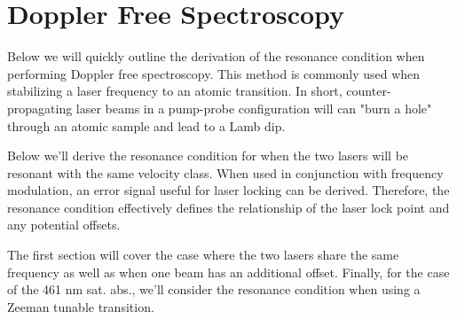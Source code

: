 \chapter{Doppler Free Spectroscopy} \label{app:dopSpec}
Below we will quickly outline the derivation of the resonance condition when performing Doppler free spectroscopy.
This method is commonly used when stabilizing a laser frequency to an atomic transition.
In short, counter-propagating laser beams in a pump-probe configuration will can "burn a hole" through an atomic sample and lead to a Lamb dip.

Below we'll derive the resonance condition for when the two lasers will be resonant with the same velocity class.
When used in conjunction with frequency modulation, an error signal useful for laser locking can be derived.
Therefore, the resonance condition effectively defines the relationship of the laser lock point and any potential offsets.

The first section will cover the case where the two lasers share the same frequency as well as when one beam has an additional offset.
Finally, for the case of the 461 nm sat. abs., we'll consider the resonance condition when using a Zeeman tunable transition. 

